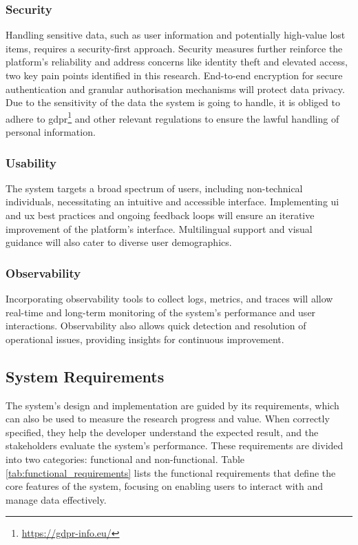 \subsubsection{Security}

Handling sensitive data, such as user information and potentially high-value lost items, requires a security-first approach. Security measures further reinforce the platform's reliability and address concerns like identity theft and elevated access, two key pain points identified in this research. End-to-end encryption for secure authentication and granular authorisation mechanisms will protect data privacy. Due to the sensitivity of the data the system is going to handle, it is obliged to adhere to \ac{gdpr}\footnote{\url{https://gdpr-info.eu/}} and other relevant regulations to ensure the lawful handling of personal information.

\subsubsection{Usability}

The system targets a broad spectrum of users, including non-technical individuals, necessitating an intuitive and accessible interface. Implementing \ac{ui} and \ac{ux} best practices and ongoing feedback loops will ensure an iterative improvement of the platform's interface. Multilingual support and visual guidance will also cater to diverse user demographics.

\subsubsection{Observability}

Incorporating observability tools to collect logs, metrics, and traces will allow real-time and long-term monitoring of the system's performance and user interactions. Observability also allows quick detection and resolution of operational issues, providing insights for continuous improvement.


\subsection{System Requirements} \label{section:requirements}

The system's design and implementation are guided by its requirements, which can also be used to measure the research progress and value. When correctly specified, they help the developer understand the expected result, and the stakeholders evaluate the system's performance. These requirements are divided into two categories: functional and non-functional. Table \ref{tab:functional_requirements} lists the functional requirements that define the core features of the system, focusing on enabling users to interact with and manage data effectively.

